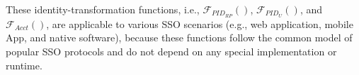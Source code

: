 







\vspace{0.5mm}
These identity-transformation functions, i.e., $\mathcal{F}_{PID_{RP}}()$, $\mathcal{F}_{PID_U}()$, and $\mathcal{F}_{Acct}()$,
    are applicable to various SSO scenarios
        (e.g., web application, mobile App, and native software),
    because these functions follow the common model of popular SSO protocols
    and do not depend on any special implementation or runtime.



